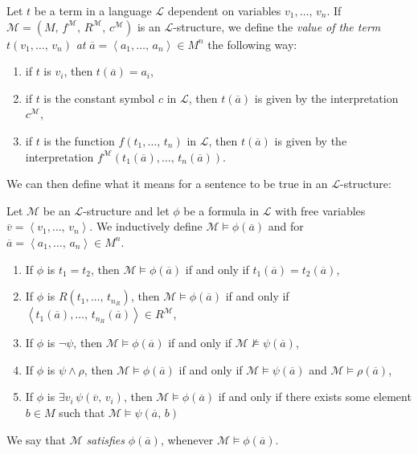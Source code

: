 \documentclass[../../main.tex]{subfiles}
\begin{document}
\begin{definition}\cite[1.3.13]{Cha90}
    Let $t$ be a term in a language $\mathcal{L}$ dependent on variables $v_1,\ldots,\, v_n$.
    If $\mathcal{M} = \left(M,\, f^{\mathcal{M}},\, R^{\mathcal{M}},\, c^{\mathcal{M}}\right)$ is an $\mathcal{L}$-structure,
    we define the \textit{value of the term} $t(v_1,\ldots,\, v_n)$ \textit{at} $\overline{a} = \left<a_1,\ldots,\, a_n\right> \in M^n$ the following way:
    \begin{enumerate}
        \item if $t$ is $v_i$, then $t(\overline{a}) = a_i$,
        \item if $t$ is the constant symbol $c$ in $\mathcal{L}$, 
        then $t(\overline{a})$ is given by the interpretation $c^{\mathcal{M}}$,
        \item if $t$ is the function $f(t_1,\ldots,\, t_n)$ in $\mathcal{L}$,
        then $t(\overline{a})$ is given by the interpretation 
        $f^{\mathcal{M}}(t_1(\overline{a}),\ldots,\, t_n(\overline{a}))$.
    \end{enumerate}
\end{definition}

We can then define what it means for a sentence to be true in an $\mathcal{L}$-structure:
\begin{definition}\label{model-satisfaction-def}\cite[Definition 1.1.6]{Mar02}
    Let $\mathcal{M}$ be an $\mathcal{L}$-structure and let $\phi$ be a formula in $\mathcal{L}$ with free variables $\overline{v} = \left<v_1,\ldots,\, v_n\right>$.
    We inductively define $\mathcal{M} \models \phi(\overline{a})$ and for $\overline{a} = \left<a_1,\ldots,\, a_n\right> \in M^n$.

    \begin{enumerate}
        \item If $\phi$ is $t_1 = t_2$,
        then $\mathcal{M} \models \phi(\overline{a})$ if and only if $t_1(\overline{a}) = t_2(\overline{a})$, 
        \item If $\phi$ is $R\left(t_1,\ldots,\, t_{n_R}\right)$,
        then $\mathcal{M} \models \phi(\overline{a})$ if and only if $\left<t_1(\overline{a}),\ldots,\, t_{n_R}(\overline{a})\right> \in R^{\mathcal{M}}$,
        \item If $\phi$ is $\lnot \psi$, 
        then $\mathcal{M} \models \phi(\overline{a})$ if and only if $\mathcal{M} \not\models \psi(\overline{a})$,
        \item If $\phi$ is $\psi \wedge \rho$, 
        then $\mathcal{M} \models \phi(\overline{a})$ if and only if $\mathcal{M} \models \psi(\overline{a})$ and $\mathcal{M} \models \rho(\overline{a})$,
        \item If $\phi$ is $\exists v_i\, \psi(\overline{v},\, v_i)$,
        then $\mathcal{M} \models \phi(\overline{a})$ if and only if there exists some element $b \in M$ such that $\mathcal{M} \models \psi(\overline{a},\, b)$
    \end{enumerate}

    We say that $\mathcal{M}$ \textit{satisfies} $\phi(\overline{a})$, whenever $\mathcal{M} \models \phi(\overline{a})$.
\end{definition}
\end{document}
